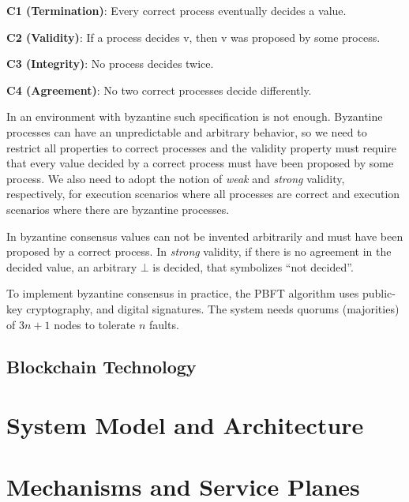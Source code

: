 \documentclass[10pt,journal,compsoc]{IEEEtran}
\begin{document}
	\begin{description}
		\item \textbf{C1 (Termination)}: Every correct process eventually decides a value.
		\item \textbf{C2 (Validity)}: If a process decides v, then v was proposed by some process.
		\item \textbf{C3 (Integrity)}: No process decides twice.
		\item \textbf{C4 (Agreement)}: No two correct processes decide differently.
	\end{description}

	In an environment with byzantine such specification is not enough. Byzantine processes can have an unpredictable and arbitrary behavior, so we need to restrict all properties to correct processes and the validity property must require that every value decided by a correct process must have been proposed by some process.
	We also need to adopt the notion of \textit{weak} and \textit{strong} validity, respectively, for execution scenarios where all processes are correct and execution scenarios where there are byzantine processes. 
	
	In byzantine consensus values can not be invented arbitrarily and must have been proposed by a correct process. In  \textit{strong} validity, if there is no agreement in the decided value, an arbitrary $\bot$ is decided, that symbolizes “not decided”.

	To implement byzantine consensus in practice, the PBFT\cite{castro1999practical} algorithm uses public-key cryptography, and digital signatures. The system needs quorums (majorities) of $3n+1$ nodes to tolerate $n$ faults. 

	\subsection{Blockchain Technology}
	\section{System Model and Architecture}


	\section{Mechanisms and Service Planes}
\end{document}
